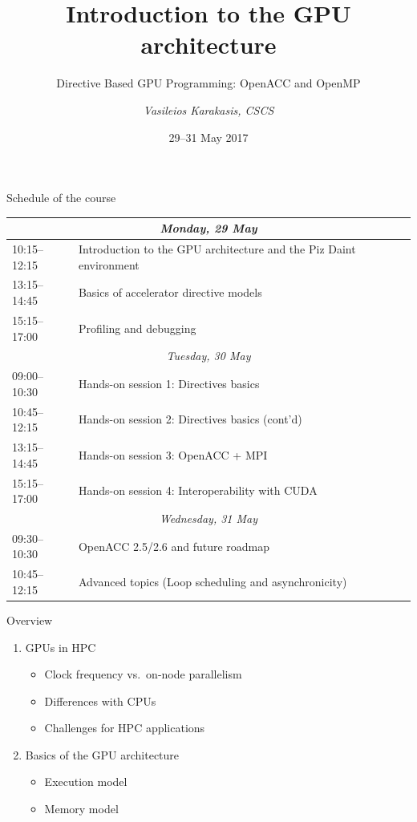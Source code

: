 \documentclass[aspectratio=169,12pt]{beamer}
\author{\emph{Vasileios Karakasis, CSCS}}
\title{Introduction to the GPU architecture}
\subtitle{Directive Based GPU Programming: OpenACC and OpenMP}
\date{29--31 May 2017}
\begin{document}
\cscstitle

\begin{frame}{Schedule of the course}
  \renewcommand\arraystretch{1.2}
  \footnotesize
  \begin{table}
    \centering
    \begin{tabular}{ll}
      \multicolumn{2}{c}{\em Monday, 29 May} \\\hline\hline
      10:15--12:15 & Introduction to the GPU architecture and the Piz Daint environment \\
      13:15--14:45 & Basics of accelerator directive models \\
      15:15--17:00 & Profiling and debugging \\\hline\hline
      \multicolumn{2}{c}{\em Tuesday, 30 May} \\\hline\hline
      09:00--10:30 & Hands-on session 1: Directives basics \\
      10:45--12:15 & Hands-on session 2: Directives basics (cont'd) \\
      13:15--14:45 & Hands-on session 3: OpenACC + MPI \\
      15:15--17:00 & Hands-on session 4: Interoperability with CUDA \\\hline\hline
      \multicolumn{2}{c}{\em Wednesday, 31 May} \\\hline\hline
      09:30--10:30 & OpenACC 2.5/2.6 and future roadmap \\
      10:45--12:15 & Advanced topics (Loop scheduling and asynchronicity)
    \end{tabular}
  \end{table}
\end{frame}


\begin{frame}{Overview}
  \begin{enumerate}
  \item GPUs in HPC
    \begin{itemize}
    \item Clock frequency vs.\ on-node parallelism
    \item Differences with CPUs
    \item Challenges for HPC applications
    \end{itemize}
    \vspace\baselineskip
  \item Basics of the GPU architecture
    \begin{itemize}
    \item Execution model
    \item Memory model
    \end{itemize}
  \end{enumerate}
\end{frame}
\end{document}
